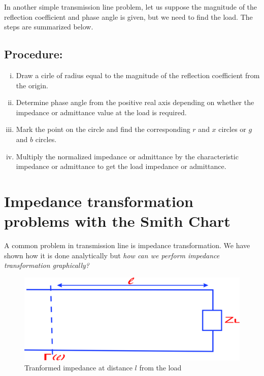 In another simple transmission line problem, let us suppose the magnitude of the reflection coefficient and phase angle is given, but we need to find the load. The steps are summarized below.
\subsection*{Procedure:}
\begin{enumerate}[(i)]
\item Draw a cirle of radius equal to the magnitude of the reflection coefficient from the origin.
\item Determine phase angle from the positive real axis depending on whether the impedance or admittance value at the load is required.
\item Mark the point on the circle and find the corresponding $r$ and $x$ circles or $g$ and $b$ circles.
\item Multiply the normalized impedance or admittance by the characteristic impedance or admittance to get the load impedance or admittance.
\end{enumerate}

\section{Impedance transformation problems with the Smith Chart}
A common problem in transmission line is impedance transformation. We have shown how it is done analytically but \emph{how can we perform impedance transformation graphically?} 
\begin{figure}[h]
\centering
\includegraphics[width=0.7\linewidth]{./graphics/wertuyuk}
\caption{Tranformed impedance at distance $l$ from the load}
\label{fig:wertuyuk}
\end{figure}


